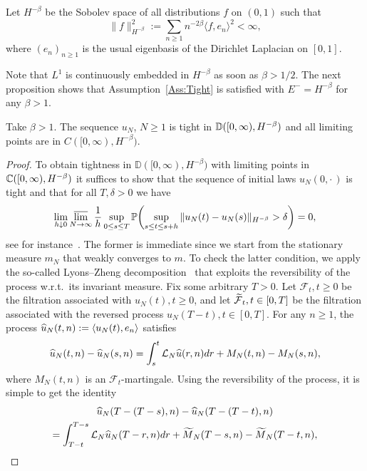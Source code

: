 \documentclass[10pt]{amsart}
\theoremstyle{definition}\newtheorem{defi}[theo]{Definition}\newtheorem{rema}[theo]{Remark}\newtheorem{exam}[theo]{Example}\newtheorem{exem}[theo]{Example}\newtheorem{nota}[theo]{Notation}
\theoremstyle{plain}
\newcommand{\bbC}{\mathbb{C}}
\newcommand{\bbD}{\mathbb{D}}
\newcommand{\bbP}{\mathbb{P}}
\newcommand{\cF}{\mathcal{F}}
\newcommand{\cL}{\mathcal{L}}
\let\oldtilde\tilde
\renewcommand*{\tilde}[1]{\mathchoice{\widetilde{#1}}{\widetilde{#1}}{\oldtilde{#1}}{\oldtilde{#1}}}
\let\oldhat\hat
\renewcommand*{\hat}[1]{\mathchoice{\widehat{#1}}{\widehat{#1}}{\oldhat{#1}}{\oldhat{#1}}}
\let\originalleft\left
\let\originalright\right
\renewcommand{\left}{\mathopen{}\mathclose\bgroup\originalleft}
\renewcommand{\right}{\aftergroup\egroup\originalright}
\renewcommand*{\to}{\mathchoice{\longrightarrow}{\rightarrow}{\rightarrow}{\rightarrow}}
\begin{document}
Let $H^{-\beta}$ be the Sobolev space of all distributions $f$ on $(0,1)$ such that
\[
\|f\|_{H^{-\beta}}^2 := \sum_{n\ge 1} n^{-2\beta} \langle f,e_n\rangle^2 < \infty,
\]
where $(e_n)_{n\ge 1}$ is the usual eigenbasis of the Dirichlet Laplacian on $[0,1]$.

Note that $L^1$ is continuously embedded in $H^{-\beta}$ as soon as $\beta > 1/2$. The next proposition shows that Assumption~\ref{Ass:Tight} is satisfied with $E^-=H^{-\beta}$ for any $\beta > 1$.

\begin{prop}\label{Prop:TightZRP}
Take $\beta > 1$. The sequence $u_N$, $N\ge 1$ is tight in $\bbD([0,\infty),\linebreak H^{-\beta})$ and all limiting points are in $C([0,\infty),H^{-\beta})$.
\end{prop}
\begin{proof}
To obtain tightness in $\bbD([0,\infty), H^{-\beta})$ with limiting points in $\bbC([0,\infty),\linebreak H^{-\beta})$ it suffices to show that the sequence of initial laws $u_N(0,\cdot\,)$ is tight and that for all $T,\delta > 0$ we have
\begin{equation}\label{Eq:TightnessZRP}
\lim_{h\downarrow 0} \varlimsup_{N\to\infty} \frac{1}{h} \sup_{0 \leq s \leq T} \bbP\left(\sup_{s\leq t \leq s+h} \| u_N(t) - u_N(s) \|_{H^{-\beta}} > \delta \right) = 0,
\end{equation}
see for instance~\cite[Theorem~13.2]{Billingsley}. The former is immediate since we start from the stationary measure $m_N$ that weakly converges to $m$. To check the latter condition, we apply the so-called Lyons--Zheng decomposition~\cite{LyonsZheng} that exploits the reversibility of the process w.r.t.~its invariant measure. Fix some arbitrary $T>0$. Let $\cF_t,t\geq 0$ be the filtration associated with $u_N(t),t\geq 0$, and let $\tilde{\cF}_t,t\in[0,T]$ be the filtration associated with the reversed process $u_N(T-t),t\in[0,T]$. For any $n\ge 1$, the process $\hat{u}_N(t,n):=\langle u_N(t), e_n\rangle$ satisfies
\begin{equation}
\hat{u}_N(t,n)-\hat{u}_N(s,n) = \int_s^t \cL_N \hat{u}(r,n) dr + M_N(t,n) - M_N(s,n),
\end{equation}
where $M_N(t,n)$ is an $\cF_t$-martingale. Using the reversibility of the process, it is simple to get the identity
\begin{multline}
\hat{u}_N(T-(T-s),n)-\hat{u}_N(T-(T-t),n)\\
= \int_{T-t}^{T-s} \cL_N \hat{u}_N(T-r,n) dr + \tilde{M}_N(T-s,n) - \tilde{M}_N(T-t,n),

\end{multline}
\end{proof}
\end{document}
